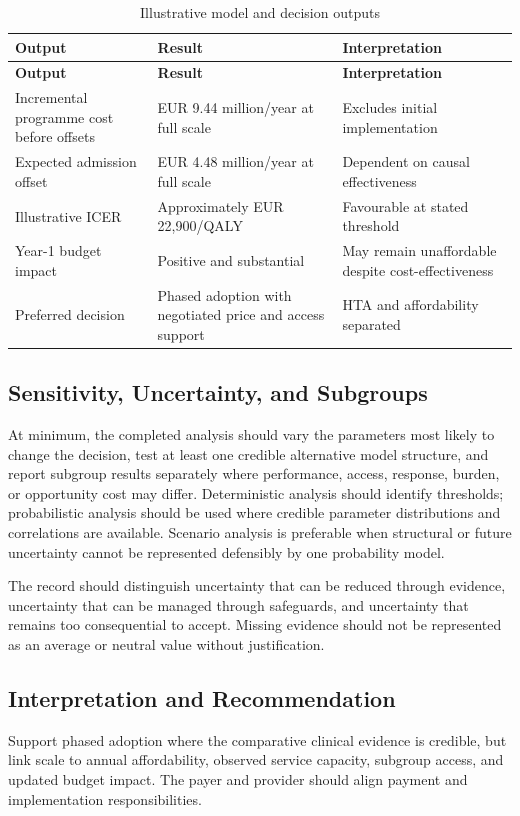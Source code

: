 \begin{longtable}{@{}p{}p{}p{}@{}}
\caption{Illustrative model and decision outputs}
\label{tab:comp-ch07-outputs}\\
\toprule
\textbf{Output} & \textbf{Result} & \textbf{Interpretation} \\
\midrule
\endfirsthead
\toprule
\textbf{Output} & \textbf{Result} & \textbf{Interpretation} \\
\midrule
\endhead
\bottomrule
\endlastfoot
Incremental programme cost before offsets & EUR 9.44 million/year at full scale & Excludes initial implementation \\
Expected admission offset & EUR 4.48 million/year at full scale & Dependent on causal effectiveness \\
Illustrative ICER & Approximately EUR 22,900/QALY & Favourable at stated threshold \\
Year-1 budget impact & Positive and substantial & May remain unaffordable despite cost-effectiveness \\
Preferred decision & Phased adoption with negotiated price and access support & HTA and affordability separated \\
\end{longtable}

\subsection{Sensitivity, Uncertainty, and Subgroups}
At minimum, the completed analysis should vary the parameters most likely to
change the decision, test at least one credible alternative model structure, and
report subgroup results separately where performance, access, response, burden,
or opportunity cost may differ. Deterministic analysis should identify thresholds;
probabilistic analysis should be used where credible parameter distributions and
correlations are available. Scenario analysis is preferable when structural or
future uncertainty cannot be represented defensibly by one probability model.

The record should distinguish uncertainty that can be reduced through evidence,
uncertainty that can be managed through safeguards, and uncertainty that remains
too consequential to accept. Missing evidence should not be represented as an
average or neutral value without justification.

\subsection{Interpretation and Recommendation}
Support phased adoption where the comparative clinical evidence is credible, but link scale to annual affordability, observed service capacity, subgroup access, and updated budget impact. The payer and provider should align payment and implementation responsibilities.

